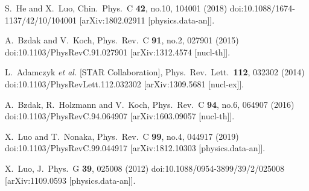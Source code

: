 \begin{thebibliography}{99}
S.~He and X.~Luo,
Chin.\ Phys.\ C \textbf{42}, no.10, 104001 (2018)
doi:10.1088/1674-1137/42/10/104001
[arXiv:1802.02911 [physics.data-an]].

A.~Bzdak and V.~Koch,
Phys.\ Rev.\ C \textbf{91}, no.2, 027901 (2015)
doi:10.1103/PhysRevC.91.027901
[arXiv:1312.4574 [nucl-th]].

L.~Adamczyk \textit{et al.} [STAR Collaboration],
Phys.\ Rev.\ Lett.\  \textbf{112}, 032302 (2014)
doi:10.1103/PhysRevLett.112.032302
[arXiv:1309.5681 [nucl-ex]].


A.~Bzdak, R.~Holzmann and V.~Koch,
Phys.\ Rev.\ C \textbf{94}, no.6, 064907 (2016)
doi:10.1103/PhysRevC.94.064907
[arXiv:1603.09057 [nucl-th]].

X.~Luo and T.~Nonaka,
Phys.\ Rev.\ C \textbf{99}, no.4, 044917 (2019)
doi:10.1103/PhysRevC.99.044917
[arXiv:1812.10303 [physics.data-an]].



X.~Luo,
J.\ Phys.\ G \textbf{39}, 025008 (2012)
doi:10.1088/0954-3899/39/2/025008
[arXiv:1109.0593 [physics.data-an]].




 

\end{thebibliography}
